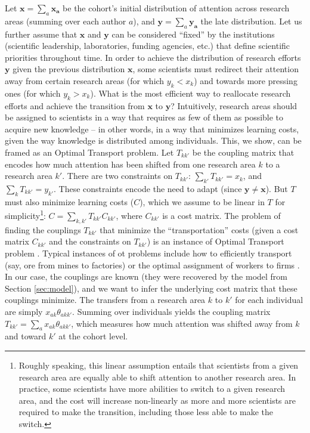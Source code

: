 \documentclass{article}
\begin{document}
Let $\bm{x}=\sum_a \bm{x_a}$ be the cohort's initial distribution of attention across research areas (summing over each author $a$), and $\bm{y}=\sum_a \bm{y_a}$ the late distribution. Let us further assume that $\bm{x}$ and $\bm{y}$ can be considered ``fixed'' by the institutions (scientific leadership, laboratories, funding agencies, etc.) that define scientific priorities throughout time. In order to achieve the distribution of research efforts $\bm{y}$ given the previous distribution $\bm{x}$, some scientists must redirect their attention away from certain research areas (for which $y_k<x_k$) and towards more pressing ones (for which $y_k>x_k$). What is the most efficient way to reallocate research efforts and achieve the transition from $\bm{x}$ to $\bm{y}$? Intuitively, research areas should be assigned to scientists in a way that requires as few of them as possible to acquire new knowledge -- in other words, in a way that minimizes learning costs, given the way knowledge is distributed among individuals. This, we show, can be framed as an Optimal Transport problem. Let $T_{kk'}$ be the coupling matrix that encodes how much attention has been shifted from one research area $k$ to a research area $k'$. There are two constraints on $T_{kk'}$: $\sum_{k'} T_{kk'} = x_k$, and $\sum_{k} T_{kk'} = y_{k'}$. These constraints encode the need to adapt (since $\bm{y}\neq \bm{x}$). But $T$ must also minimize learning costs ($C$), which we assume to be linear in $T$ for simplicity\footnote{Roughly speaking, this linear assumption entails that scientists from a given research area are equally able to shift attention to another research area. In practice, some scientists have more abilities to switch to a given research area, and the cost will increase non-linearly as more and more scientists are required to make the transition, including those less able to make the switch.}: $C=\sum_{k,k'}T_{kk'}C_{kk'}$, where $C_{kk'}$ is a cost matrix. The problem of finding the couplings $T_{kk'}$ that minimize the ``transportation'' costs (given a cost matrix $C_{kk'}$ and the constraints on $T_{kk'}$) is an instance of Optimal Transport problem \citep{Peyr2019}. Typical instances of \gls{ot} problems include how to efficiently transport (say, ore from mines to factories) or the optimal assignment of workers to firms \citep{galichon2018optimal}. In our case, the couplings are known (they were recovered by the model from Section \ref{sec:model}), and we want to infer the underlying cost matrix that these couplings minimize. The transfers from a research area $k$ to $k'$ for each individual are simply $x_{ak}\theta_{akk'}$. Summing over individuals yields the coupling matrix $T_{kk'}=\sum_a x_{ak} \theta_{akk'}$, which measures how much attention was shifted away from $k$ and toward $k'$ at the cohort level.
\end{document}
